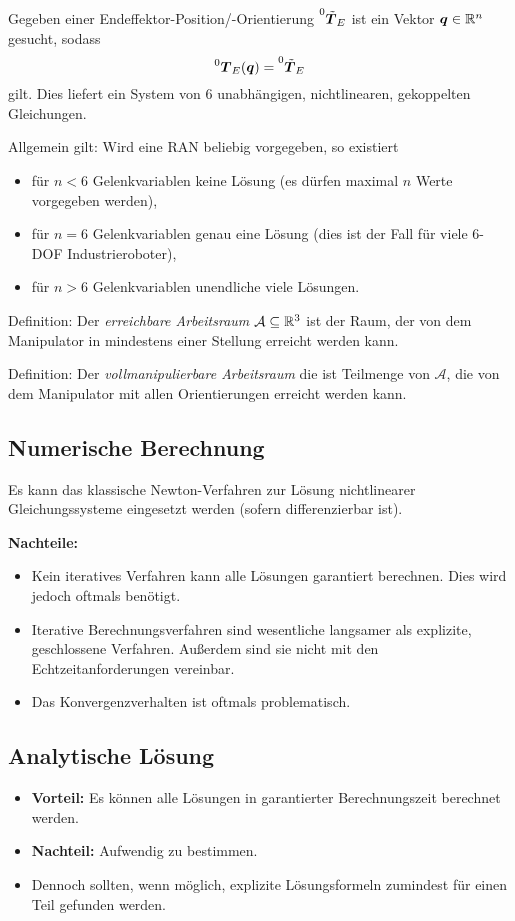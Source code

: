 		Gegeben einer Endeffektor-Position/-Orientierung \( \prescript{0}{}{\tilde{\bm{T}}}_E \) ist ein Vektor \( \bm{q} \in \mathbb{R}^n \) gesucht, sodass
		\begin{equation*}
			\prescript{0}{}{\bm{T}}_E(\bm{q}) = \prescript{0}{}{\tilde{\bm{T}}}_E
		\end{equation*}
		gilt. Dies liefert ein System von \(6\) unabhängigen, nichtlinearen, gekoppelten Gleichungen.

		Allgemein gilt: Wird eine RAN beliebig vorgegeben, so existiert
		\begin{itemize}
			\item für \( n < 6 \) Gelenkvariablen \iA keine Lösung (es dürfen maximal \(n\) Werte vorgegeben werden),
			\item für \( n = 6 \) Gelenkvariablen \iA genau eine Lösung (dies ist der Fall für viele \num{6}-DOF Industrieroboter),
			\item für \( n > 6 \) Gelenkvariablen \iA unendliche viele Lösungen.
		\end{itemize}

		Definition: Der \emph{erreichbare Arbeitsraum} \(\mathcal{A} \subseteq \mathbb{R}^3\) ist der Raum, der von dem Manipulator in mindestens einer Stellung erreicht werden kann.

		Definition: Der \emph{vollmanipulierbare Arbeitsraum} die ist Teilmenge von \(\mathcal{A}\), die von dem Manipulator mit allen Orientierungen erreicht werden kann.

		\subsection{Numerische Berechnung}
			Es kann \bspw das klassische Newton-Verfahren zur Lösung nichtlinearer Gleichungssysteme eingesetzt werden (sofern \DIRKIN differenzierbar ist).

			\textbf{Nachteile:}
			\begin{itemize}
				\item Kein iteratives Verfahren kann alle Lösungen garantiert berechnen. Dies wird jedoch oftmals benötigt.
				\item Iterative Berechnungsverfahren sind wesentliche langsamer als explizite, geschlossene Verfahren. Außerdem sind sie nicht mit den Echtzeitanforderungen vereinbar.
				\item Das Konvergenzverhalten ist oftmals problematisch.
			\end{itemize}

		\subsection{Analytische Lösung}
			\begin{itemize}
				\item \textbf{Vorteil:} Es können alle Lösungen in garantierter Berechnungszeit berechnet werden.
				\item \textbf{Nachteil:} Aufwendig zu bestimmen.
				\item Dennoch sollten, wenn möglich, explizite Lösungsformeln zumindest für einen Teil gefunden werden.
			\end{itemize}

